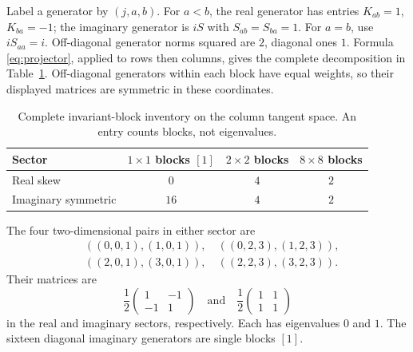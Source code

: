 \documentclass[11pt,a4paper]{article}
\begin{document}
Label a generator by $(j,a,b)$. For $a<b$, the real generator has entries $K_{ab}=1$, $K_{ba}=-1$; the imaginary generator is $iS$ with $S_{ab}=S_{ba}=1$. For $a=b$, use $iS_{aa}=i$. Off-diagonal generator norms squared are $2$, diagonal ones $1$. Formula \eqref{eq:projector}, applied to rows then columns, gives the complete decomposition in Table~\ref{tab:blocks}. Off-diagonal generators within each block have equal weights, so their displayed matrices are symmetric in these coordinates.

\begin{table}[H]
\centering
\caption{Complete invariant-block inventory on the column tangent space. An entry counts blocks, not eigenvalues.}
\label{tab:blocks}
\begin{tabular}{lccc}
\toprule
Sector & $1\times1$ blocks $[1]$ & $2\times2$ blocks & $8\times8$ blocks\\
\midrule
Real skew & $0$ & $4$ & $2$\\
Imaginary symmetric & $16$ & $4$ & $2$\\
\bottomrule
\end{tabular}
\end{table}

The four two-dimensional pairs in either sector are
\begin{align*}
 &((0,0,1),(1,0,1)),\quad ((0,2,3),(1,2,3)),\\
 &((2,0,1),(3,0,1)),\quad ((2,2,3),(3,2,3)).
\end{align*}
Their matrices are
\begin{equation}
 \frac12\begin{pmatrix}1&-1\\-1&1\end{pmatrix}
 \quad\text{and}\quad
 \frac12\begin{pmatrix}1&1\\1&1\end{pmatrix}
 \label{eq:smallblocks}
\end{equation}
in the real and imaginary sectors, respectively. Each has eigenvalues $0$ and $1$. The sixteen diagonal imaginary generators are single blocks $[1]$.
\end{document}
